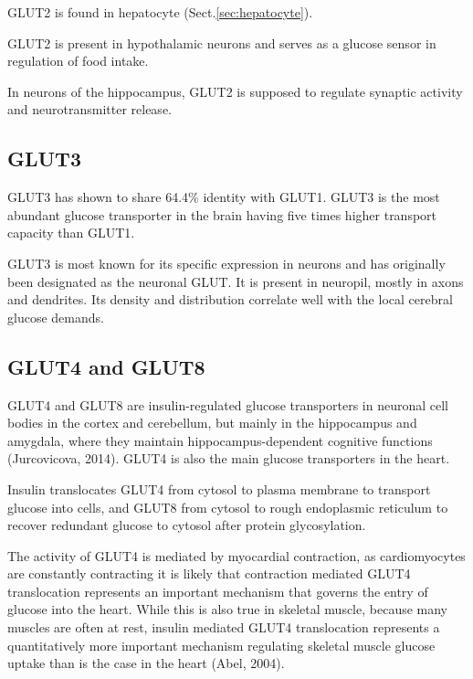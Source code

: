 GLUT2 is found in hepatocyte (Sect.\ref{sec:hepatocyte}).

GLUT2 is present in hypothalamic neurons and serves as a glucose sensor in
regulation of food intake.

In neurons of the hippocampus, GLUT2 is supposed to regulate synaptic activity
and neurotransmitter release.

\subsection{GLUT3}
\label{sec:GLUT3}

GLUT3 has shown to share 64.4\% identity with GLUT1.
GLUT3 is the most abundant glucose transporter in the brain having five times
higher transport capacity than GLUT1.

GLUT3 is most known for its specific expression in neurons and has originally
been designated as the neuronal GLUT.  It is present in neuropil, mostly in
axons and dendrites. Its density and distribution correlate well with the local
cerebral glucose demands. 

\subsection{GLUT4 and GLUT8}
\label{sec:GLUT4}
\label{sec:GLUT8}

GLUT4 and GLUT8 are insulin-regulated glucose transporters in neuronal cell
bodies in the cortex and cerebellum, but mainly in the hippocampus and amygdala,
where they maintain hippocampus-dependent cognitive functions (Jurcovicova,
2014). GLUT4 is also the main glucose transporters in the heart. 

Insulin translocates GLUT4 from cytosol to plasma membrane to transport glucose
into cells, and GLUT8 from cytosol to rough endoplasmic reticulum to recover
redundant glucose to cytosol after protein glycosylation.

The activity of GLUT4 is mediated by myocardial contraction, as cardiomyocytes
are constantly contracting it is likely that contraction mediated GLUT4
translocation represents an important mechanism that governs the entry of
glucose into the heart. While this is also true in skeletal muscle, because many
muscles are often at rest, insulin mediated GLUT4 translocation represents a
quantitatively more important mechanism regulating skeletal muscle glucose
uptake than is the case in the heart (Abel, 2004). 


